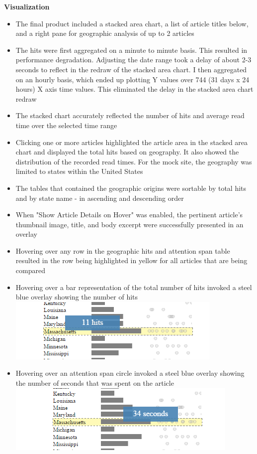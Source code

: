 \documentclass[12pt]{article}
\begin{document}
{\noindent\textbf{Visualization} 
\begin{itemize}
\item The final product included a stacked area chart, a list of article titles below, and a right pane for geographic analysis of up to 2 articles
\item The hits were first aggregated on a minute to minute basis. This resulted in performance degradation. Adjusting the date range took a delay of about 2-3 seconds to reflect in the redraw of the stacked area chart. I then aggregated on an hourly basis, which ended up plotting Y values over 744 (31 days x 24 hours) X axis time values. This eliminated the delay in the stacked area chart redraw
\item The stacked chart accurately reflected the number of hits and average read time over the selected time range
\item Clicking one or more articles highlighted the article area in the stacked area chart and displayed the total hits based on geography. It also showed the distribution of the recorded read times. For the mock site, the geography was limited to states within the United States
\item The tables that contained the geographic origins were sortable by total hits and by state name - in ascending and descending order
\item When "Show Article Details on Hover" was enabled, the pertinent article's thumbnail image, title, and body excerpt were successfully presented in an overlay
\item Hovering over any row in the geographic hits and attention span table resulted in the row being highlighted in yellow for all articles that are being compared
\item Hovering over a bar representation of the total number of hits invoked a steel blue overlay showing the number of hits
\\
\noindent\includegraphics[scale=0.8]{img/state_hit_hover} \\  

\item Hovering over an attention span circle invoked a steel blue overlay showing the number of seconds that was spent on the article
\noindent\includegraphics[scale=0.8]{img/state_circle_hover} \\  
\end{itemize} 

}
\end{document}
